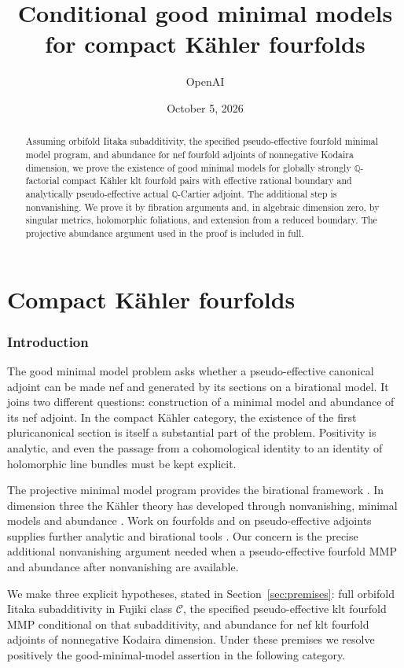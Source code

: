 \documentclass[11pt,letterpaper]{article}
\title{Conditional good minimal models\\for compact K\"ahler fourfolds}
\author{OpenAI}
\date{October 5, 2026}
\theoremstyle{definition}
\theoremstyle{remark}
\begin{document}
\begin{abstract}
Assuming orbifold Iitaka subadditivity, the specified pseudo-effective
fourfold minimal model program, and abundance for nef fourfold adjoints
of nonnegative Kodaira dimension, we prove the existence of good minimal
models for globally strongly \(\mathbb{Q}\)-factorial compact K\"ahler klt
fourfold pairs with effective rational boundary and analytically
pseudo-effective actual \(\mathbb{Q}\)-Cartier adjoint. The additional step
is nonvanishing. We prove it by
fibration arguments and, in algebraic dimension zero, by singular
metrics, holomorphic foliations, and extension from a reduced boundary.
The projective abundance argument used in the proof is included in full.
\end{abstract}
\tableofcontents
 
\part{Compact K\"ahler fourfolds}
\section{Introduction}\label{sec:introduction}

The good minimal model problem asks whether a pseudo-effective
canonical adjoint can be made nef and generated by its sections on a
birational model. It joins two different questions: construction of a
minimal model and abundance of its nef adjoint. In the compact
K\"ahler category, the existence of the first pluricanonical section
is itself a substantial part of the problem. Positivity is analytic,
and even the passage from a cohomological identity to an identity of
holomorphic line bundles must be kept explicit.

The projective minimal model program provides the birational framework
\cite{BirationalGeometry,BCHM}. In dimension three the K\"ahler
theory has developed through nonvanishing, minimal models and
abundance \cite{DemaillyPeternellNonvanishing,HPMinimalModels,
CHPAbundance,CHPAbundanceErratum,GuenanciaPaunBogomolovGieseker}.
Work on fourfolds and on
pseudo-effective adjoints supplies further analytic and birational
tools \cite{DHPFourfoldMMP,HLLNonvanishing}. Our concern is the
precise additional nonvanishing argument needed when a
pseudo-effective fourfold MMP and abundance after nonvanishing are
available.

We make three explicit hypotheses, stated in
Section~\ref{sec:premises}: full orbifold Iitaka subadditivity in
Fujiki class \(\mathcal C\), the specified pseudo-effective klt
fourfold MMP conditional on that subadditivity, and abundance for nef
klt fourfold adjoints of nonnegative Kodaira dimension. Under these
premises we resolve positively the good-minimal-model assertion in
the following category.
\end{document}
